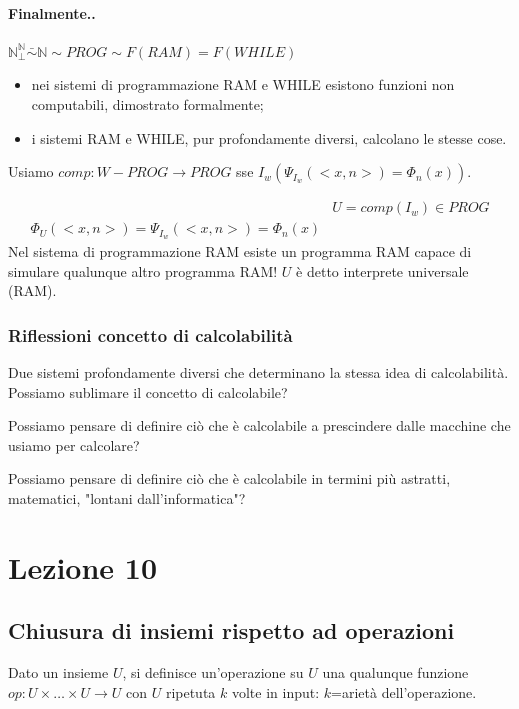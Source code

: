 \documentclass{article}
\begin{document}
\paragraph{Finalmente..}
$\mathbb{N}_{\perp}^{\mathbb{N}} \bar{\sim} \mathbb{N} \sim PROG \sim F(RAM) = F(WHILE)$
\begin{itemize}
	\item nei sistemi di programmazione RAM e WHILE esistono funzioni non computabili, dimostrato formalmente;
	\item i sistemi RAM e WHILE, pur profondamente diversi, calcolano le stesse cose.
\end{itemize}




Usiamo $comp:W-PROG \rightarrow PROG$ sse $I_w(\Psi_{I_w}(<x,n>)=\Phi_n(x))$.

\begin{displaymath}
	\begin{split}
		&U=comp(I_w) \in PROG \\
		\Phi_U(<x,n>)=\Psi_{I_w}(<x,n>)=\Phi_n(x)
	\end{split}
\end{displaymath}
Nel sistema di programmazione RAM esiste un programma RAM capace di simulare qualunque altro programma RAM! $U$ è detto interprete universale (RAM).

\subsubsection{Riflessioni concetto di calcolabilità}
Due sistemi profondamente diversi che determinano la stessa idea di calcolabilità. Possiamo sublimare il concetto di calcolabile?



Possiamo pensare di definire ciò che è calcolabile a prescindere dalle macchine che usiamo per calcolare?



Possiamo pensare di definire ciò che è calcolabile in termini più astratti, matematici, "lontani dall'informatica"?


\section{Lezione 10}
\subsection{Chiusura di insiemi rispetto ad operazioni}
Dato un insieme $U$, si definisce un'operazione su $U$ una qualunque funzione $op:U\times \dots \times U \rightarrow U$ con $U$ ripetuta $k$ volte in input: $k$=arietà dell'operazione.
\end{document}
